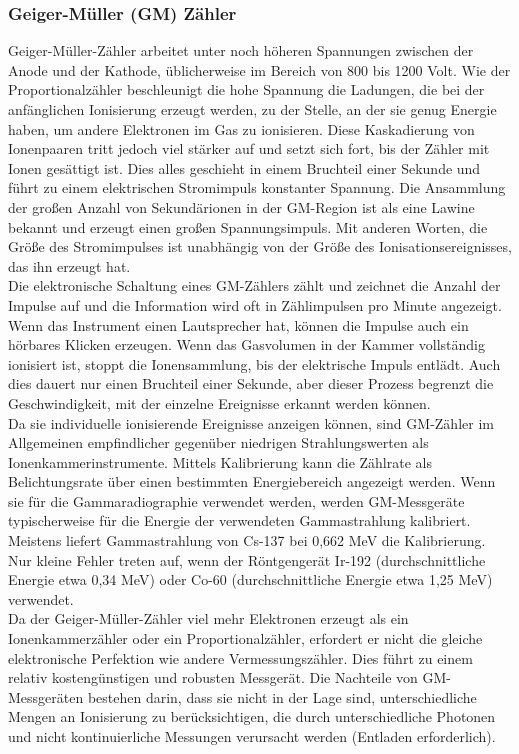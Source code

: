 {\subsubsection{Geiger-Müller (GM) Zähler}
Geiger-Müller-Zähler arbeitet unter noch höheren Spannungen zwischen der Anode und der Kathode, üblicherweise im Bereich von 800 bis 1200 Volt. Wie der Proportionalzähler beschleunigt die hohe Spannung die Ladungen, die bei der anfänglichen Ionisierung erzeugt werden, zu der Stelle, an der sie genug Energie haben, um andere Elektronen im Gas zu ionisieren. Diese Kaskadierung von Ionenpaaren tritt jedoch viel stärker auf und setzt sich fort, bis der Zähler mit Ionen gesättigt ist. Dies alles geschieht in einem Bruchteil einer Sekunde und führt zu einem elektrischen Stromimpuls konstanter Spannung. Die Ansammlung der großen Anzahl von Sekundärionen in der GM-Region ist als eine Lawine bekannt und erzeugt einen großen Spannungsimpuls. Mit anderen Worten, die Größe des Stromimpulses ist unabhängig von der Größe des Ionisationsereignisses, das ihn erzeugt hat.\\
Die elektronische Schaltung eines GM-Zählers zählt und zeichnet die Anzahl der Impulse auf und die Information wird oft in Zählimpulsen pro Minute angezeigt. Wenn das Instrument einen Lautsprecher hat, können die Impulse auch ein hörbares Klicken erzeugen. Wenn das Gasvolumen in der Kammer vollständig ionisiert ist, stoppt die Ionensammlung, bis der elektrische Impuls entlädt. Auch dies dauert nur einen Bruchteil einer Sekunde, aber dieser Prozess begrenzt die Geschwindigkeit, mit der einzelne Ereignisse erkannt werden können.\\
Da sie individuelle ionisierende Ereignisse anzeigen können, sind GM-Zähler im Allgemeinen empfindlicher gegenüber niedrigen Strahlungswerten als Ionenkammerinstrumente. Mittels Kalibrierung kann die Zählrate als Belichtungsrate über einen bestimmten Energiebereich angezeigt werden. Wenn sie für die Gammaradiographie verwendet werden, werden GM-Messgeräte typischerweise für die Energie der verwendeten Gammastrahlung kalibriert. Meistens liefert Gammastrahlung von Cs-137 bei 0,662 MeV die Kalibrierung. Nur kleine Fehler treten auf, wenn der Röntgengerät Ir-192 (durchschnittliche Energie etwa 0,34 MeV) oder Co-60 (durchschnittliche Energie etwa 1,25 MeV) verwendet.\\
Da der Geiger-Müller-Zähler viel mehr Elektronen erzeugt als ein Ionenkammerzähler oder ein Proportionalzähler, erfordert er nicht die gleiche elektronische Perfektion wie andere Vermessungszähler. Dies führt zu einem relativ kostengünstigen und robusten Messgerät. Die Nachteile von GM-Messgeräten bestehen darin, dass sie nicht in der Lage sind, unterschiedliche Mengen an Ionisierung zu berücksichtigen, die durch unterschiedliche Photonen und nicht kontinuierliche Messungen verursacht werden (Entladen erforderlich).
}
